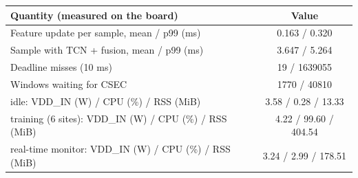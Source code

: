 \begin{tabular}{lc}
\hline
Quantity (measured on the board) & Value \\
\hline
Feature update per sample, mean / p99 (ms) & 0.163 / 0.320 \\
Sample with TCN + fusion, mean / p99 (ms) & 3.647 / 5.264 \\
Deadline misses (10 ms) & 19 / 1639055 \\
Windows waiting for CSEC & 1770 / 40810 \\
idle: VDD\_IN (W) / CPU (\%) / RSS (MiB) & 3.58 / 0.28 / 13.33 \\
training (6 sites): VDD\_IN (W) / CPU (\%) / RSS (MiB) & 4.22 / 99.60 / 404.54 \\
real-time monitor: VDD\_IN (W) / CPU (\%) / RSS (MiB) & 3.24 / 2.99 / 178.51 \\
\hline
\end{tabular}
